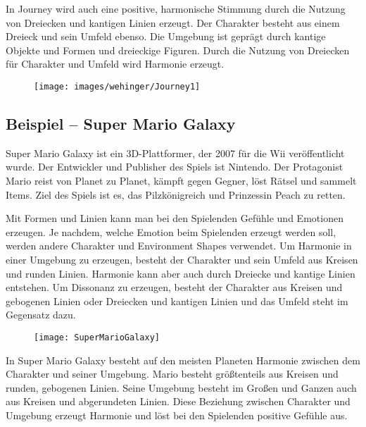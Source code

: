 In Journey wird auch eine positive, harmonische Stimmung durch die Nutzung von Dreiecken und kantigen Linien erzeugt. Der Charakter besteht aus einem Dreieck und sein Umfeld ebenso. Die Umgebung ist geprägt durch kantige Objekte und Formen und dreieckige Figuren. Durch die Nutzung von Dreiecken für Charakter und Umfeld wird Harmonie erzeugt. 
\cite{_drawing_basics_and_video_game_art}

\begin{figure}[H]
	\centering
	\texttt{[image: images/wehinger/Journey1]}
	\caption{\cite{_journey}}
\end{figure}

\subsection{Beispiel – Super Mario Galaxy}
Super Mario Galaxy ist ein 3D-Plattformer, der 2007 für die Wii veröffentlicht wurde. Der Entwickler und Publisher des Spiels ist Nintendo. Der Protagonist Mario reist von Planet zu Planet, kämpft gegen Gegner, löst Rätsel und sammelt Items. Ziel des Spiels ist es, das Pilzkönigreich und Prinzessin Peach zu retten. 

Mit Formen und Linien kann man bei den Spielenden Gefühle und Emotionen erzeugen. Je nachdem, welche Emotion beim Spielenden erzeugt werden soll, werden andere Charakter und Environment Shapes verwendet. Um Harmonie in einer Umgebung zu erzeugen, besteht der Charakter und sein Umfeld aus Kreisen und runden Linien. Harmonie kann aber auch durch Dreiecke und kantige Linien entstehen. Um Dissonanz zu erzeugen, besteht der Charakter aus Kreisen und gebogenen Linien oder Dreiecken und kantigen Linien und das Umfeld steht im Gegensatz dazu.
\cite{_drawing_basics_and_video_game_art}

\begin{figure}[H]
	\centering
	\texttt{[image: SuperMarioGalaxy]}
	\caption{\cite{_drawing_basics_and_video_game_art}}
\end{figure}

In Super Mario Galaxy besteht auf den meisten Planeten Harmonie zwischen dem Charakter und seiner Umgebung. Mario besteht größtenteils aus Kreisen und runden, gebogenen Linien. Seine Umgebung besteht im Großen und Ganzen auch aus Kreisen und abgerundeten Linien. Diese Beziehung zwischen Charakter und Umgebung erzeugt Harmonie und löst bei den Spielenden positive Gefühle aus. 
\cite{_drawing_basics_and_video_game_art}



